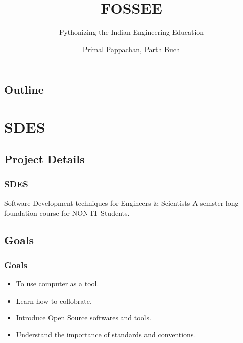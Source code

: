 \documentclass[compress,red]{beamer} %
\title{FOSSEE}
\subtitle{Pythonizing the Indian Engineering Education}
\author[]{Primal Pappachan, Parth Buch}  %
\institute{IIT Bombay}
\date[]{} %
\begin{document}
\begin{frame}
	 \titlepage
\end{frame}

\begin{frame}
\section*{Outline}
\tableofcontents
\end{frame}



\section{SDES}
\subsection{Project Details}
\begin{frame}
\frametitle{SDES}
\begin{block}{Software Development techniques for Engineers \& Scientists}
A semster long foundation course for NON-IT Students.
\end{block}
\end{frame}

\subsection{Goals}
\begin{frame}
\frametitle{Goals}
\begin{itemize}
\item To use computer as a tool.
\item Learn how to collobrate.
\item Introduce Open Source softwares and tools.
\item Understand the importance of standards and conventions.
\end{itemize}
\end{frame}
\end{document}
